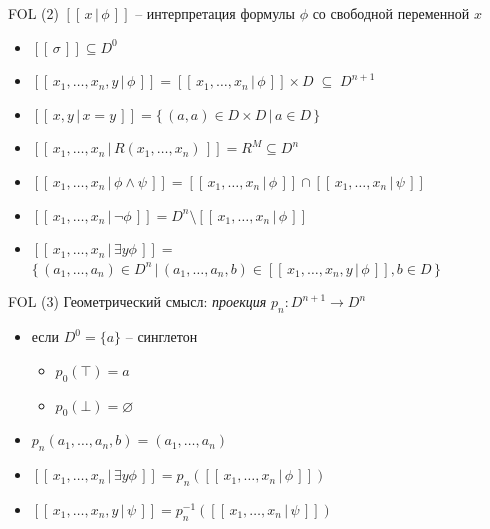 \documentclass{beamer}
\begin{document}
\begin{frame}{FOL (2)}
$[ \! [ \, x \, \vert \, \phi \, ] \! ]$ -- интерпретация формулы $\phi$ со свободной переменной $x$\\
\bigskip
\begin{small}
\begin{itemize}
	\item $[ \! [ \, \sigma \, ] \! ] \subseteq D^0$ 
	\item $[ \! [ \, x_1, \ldots, x_n, y \, \vert \, \phi \, ] \! ] = [ \! [ \, x_1, \ldots, x_n \, \vert \, \phi \, ] \! ] \times D \; \subseteq \; D^{n+1}$ 
	\item $[ \! [ \, x, y \, \vert \, x = y \, ] \! ] = \{ \, (a, a) \in D \times D \, \vert \, a \in D \, \}$ 
	\item $[ \! [ \, x_1, \ldots, x_n \, \vert \, R(x_1, \ldots, x_n) \, ] \! ] = R^M \subseteq D^n$ 
	\item $[ \! [ \, x_1, \ldots, x_n \, \vert \, \phi \wedge \psi \, ] \! ] = [ \! [ \, x_1, \ldots, x_n \, \vert \, \phi \, ] \! ] \cap [ \! [ \, x_1, \ldots, x_n \, \vert \, \psi \, ] \! ]$ 
	\item $[ \! [ \, x_1, \ldots, x_n \, \vert \, \neg \phi \, ] \! ] = D^n \setminus [ \! [ \, x_1, \ldots, x_n \, \vert \, \phi \, ] \! ]$
	\item $[ \! [ \, x_1, \ldots, x_n \, \vert \, \exists y \phi \, ] \! ] = $\\ \smallskip $\{ \, (a_1, \ldots, a_n) \in D^n \, \vert \, (a_1, \ldots, a_n, b) \in [ \! [ \, x_1, \ldots, x_n, y \, \vert \, \phi \, ] \! ], b \in D \, \}$
\end{itemize}
\end{small}
\end{frame}

\begin{frame}{FOL (3)}
Геометрический смысл: \textit{проекция} $p_n : D^{n+1} \to D^n$\\
\medskip
\begin{itemize}
	\item если $D^0 = \{ a \}$ -- синглетон
		\begin{itemize}
			\item $p_0(\top) = a$
			\item $p_0(\bot) = \varnothing$
		\end{itemize}
	\item {\small $p_n(a_1, \ldots, a_n, b) = (a_1, \ldots, a_n)$}
	\item {\small $[ \! [ \, x_1, \ldots, x_n \, \vert \, \exists y \phi \, ] \! ] = p_n([ \! [ \, x_1, \ldots, x_n \, \vert \, \phi \, ] \! ])$}
	\item {\small $[ \! [ \, x_1, \ldots, x_n, y \, \vert \, \psi \, ] \! ] = p_n^{-1}([ \! [ \, x_1, \ldots, x_n \, \vert \, \psi \, ] \! ])$}
\end{itemize}
\end{frame}
\end{document}
